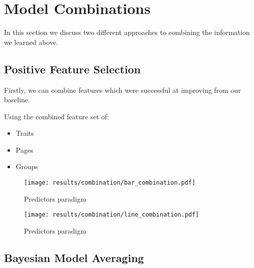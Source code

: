 
\chapter{Model Combinations}
\label{cha:bma}

In this section we discuss two different approaches to combining the information we learned above.

\section{Positive Feature Selection}
\label{sec:notation}

Firstly, we can combine features which were successful at improving from our baseline.

Using the combined feature set of:
\begin{itemize}
\item Traits
\item Pages
\item Groups
\end{itemize}

\begin{figure}[h]
	\begin{center}
		\texttt{[image: results/combination/bar\_combination.pdf]}
		\caption{Predictors paradigm}
	\end{center}
\end{figure}

\begin{figure}[h]
	\begin{center}
		\texttt{[image: results/combination/line\_combination.pdf]}
		\caption{Predictors paradigm}
	\end{center}
\end{figure}


\section{Bayesian Model Averaging}
\label{sec:bma}

